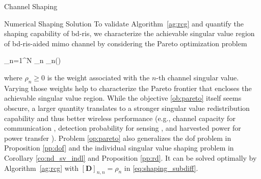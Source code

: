 \documentclass[journal]{IEEEtran}
\begin{document}
\begin{section}{Channel Shaping}
\begin{subsection}{Numerical Shaping Solution}
		To validate Algorithm~\ref{ag:rcg} and quantify the shaping capability of \gls{bd}-\gls{ris}, we characterize the achievable singular value region of \gls{bd}-\gls{ris}-aided \gls{mimo} channel by considering the Pareto optimization problem
		\begin{maxi!}
			{\scriptstyle{\mathbf{\Theta}}}{\sum_{n=1}^N \rho_n \sigma_n()}{\label{op:pareto}}{\label{ob:pareto}}
		\end{maxi!}
		where $\rho_n \ge 0$ is the weight associated with the $n$-th channel singular value.
		Varying those weights help to characterize the Pareto frontier that encloses the achievable singular value region.
		While the objective \eqref{ob:pareto} itself seems obscure, a larger quantity translates to a stronger singular value redistribution capability and thus better wireless performance (e.g., channel capacity for communication \cite{Clerckx2013}, detection probability for sensing \cite{Liu2022c}, and harvested power for power transfer \cite{Shen2021}).
		Problem \eqref{op:pareto} also generalizes the \gls{dof} problem in Proposition \ref{pp:dof} and the individual singular value shaping problem in Corollary \ref{co:nd_sv_indl} and Proposition \ref{pp:rd}.
		It can be solved optimally by Algorithm~\ref{ag:rcg} with $[\mathbf{D}]_{n,n} = \rho_n$ in \eqref{eq:shaping_subdiff}.
	\end{subsection}
\end{section}
\end{document}
